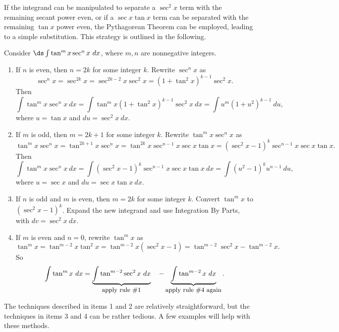 If the integrand can be manipulated to separate a $\sec^2x$ term with the remaining secant power even, or if a $\sec x\tan x$ term can be separated with the remaining $\tan x$ power even, the Pythagorean Theorem can be employed, leading to a simple substitution. This strategy is outlined in the following.







\begin{formulabox}
Consider $\ds\int\tan^mx\sec^nx\ dx$, where $m,n$ are nonnegative integers.
\begin{enumerate}
\item		If $n$ is even, then $n=2k$ for some integer $k$. Rewrite $\sec^nx$ as 
$$\sec^nx = \sec^{2k}x = \sec^{2k-2}x\sec^2x = (1+\tan^2x)^{k-1}\sec^2x.$$
Then
$$\int\tan^mx\sec^nx\ dx=\int\tan^mx(1+\tan^2x)^{k-1}\sec^2x\ dx = \int u^m(1+u^2)^{k-1}\ du,$$
where $u = \tan x$ and $du = \sec^2x\ dx$.

\item		If $m$ is odd, then $m=2k+1$ for some integer $k$. Rewrite $\tan^mx\sec^nx$ as
$$\tan^mx\sec^nx = \tan^{2k+1}x\sec^nx = \tan^{2k}x\sec^{n-1}x\sec x\tan x = (\sec^2x-1)^k\sec^{n-1}x\sec x\tan x.$$
Then
$$\int\tan^mx\sec^nx\ dx=\int(\sec^2x-1)^k\sec^{n-1}x\sec x\tan x\ dx = \int(u^2-1)^ku^{n-1}\ du,$$
where $u = \sec x$ and $du = \sec x\tan x\ dx$.

\item If $n$ is odd and $m$ is even, then $m=2k$ for some integer $k$. Convert $\tan^mx $ to $(\sec^2x-1)^k$. Expand the new integrand and use Integration By Parts, with $dv = \sec^2x\ dx$.

\item		If $m$ is even and $n=0$, rewrite $\tan^mx$ as
$$\tan^mx = \tan^{m-2}x\tan^2x = \tan^{m-2}x(\sec^2x-1) = \tan^{m-2}\sec^2x-\tan^{m-2}x.$$
So
$$\int\tan^mx\ dx = \underbrace{\int\tan^{m-2}\sec^2x\ dx}_{\text{\small apply rule \#1}}\quad - \underbrace{\int\tan^{m-2}x\ dx}_{\text{\small apply rule \#4 again}}.$$

\end{enumerate}
\end{formulabox}

The techniques described in items 1 and 2 are relatively straightforward, but the techniques in items 3 and 4 can be rather tedious. A few examples will help with these methods.\\


